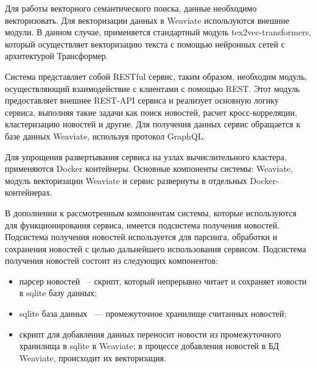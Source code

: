 Для работы векторного семантического поиска, данные необходимо векторизовать. Для векторизации данных в Weaviate используются внешние модули. В данном случае, применяется стандартный модуль tex2vec-transformers, который осуществляет векторизацию текста с помощью нейронных сетей с архитектурой Трансформер.

Система представляет собой RESTful сервис, таким образом, необходим модуль, осуществляющий взаимодействие с клиентами с помощью REST. Этот модуль предоставляет внешнее REST-API сервиса и реализует основную логику сервиса, выполняя такие задачи как поиск новостей, расчет кросс-корреляции, кластеризацию новостей и другие. Для получения данных сервис обращается к базе данных Weaviate, используя протокол GraphQL.

Для упрощения развертывания сервиса на узлах вычислительного кластера, применяются Docker контейнеры. Основные компоненты системы: Weaviate, модуль векторизации Weaviate и сервис развернуты в отдельных Docker-контейнерах.

В дополнении к рассмотренным компонентам системы, которые используются для функционирования сервиса, имеется подсистема получения новостей. Подсистема получения новостей используется для парсинга, обработки и сохранения новостей с целью дальнейшего использования сервисом. Подсистема получения новостей состоит из следующих компонентов:
\begin{itemize}
    \item парсер новостей ~-- скрипт, который непрерывно читает и сохраняет новости в sqlite базу данных;
    \item sqlite база данных ~--- промежуточное хранилище считанных новостей;
    \item скрипт для добавления данных переносит новости из промежуточного хранилища в sqlite в Weaviate; в процессе добавления новостей в БД Weaviate, происходит их векторизация.
\end{itemize}
